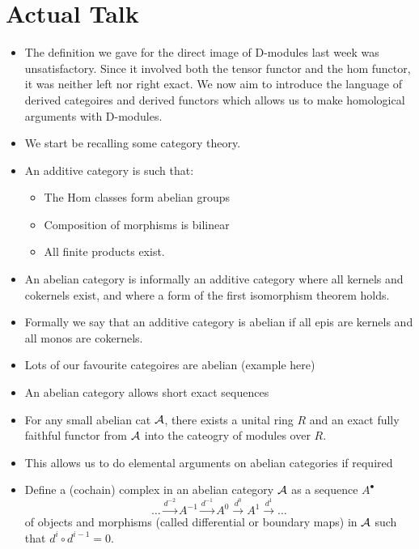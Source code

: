 \documentclass[a4paper]{article}
\begin{document}
\section{Actual Talk}
\begin{itemize}
    \item The definition we gave for the direct image of D-modules last week was unsatisfactory. Since it involved both the tensor functor and the hom functor, it was neither left nor right exact. We now aim to introduce the language of derived categoires and derived functors which allows us to make homological arguments with D-modules.
    \item We start be recalling some category theory.
    \item An additive category is such that:
        \begin{itemize}
            \item The Hom classes form abelian groups
            \item Composition of morphisms is bilinear
            \item All finite products exist.
        \end{itemize}
    \item An abelian category is informally an additive category where all kernels and cokernels exist, and where a form of the first isomorphism theorem holds.
    \item Formally we say that an additive category is abelian if all epis are kernels and all monos are cokernels.
    \item Lots of our favourite categoires are abelian (example here)
    \item An abelian category allows short exact sequences
    \item 
        \begin{Theorem}
            For any small abelian cat $\mathcal{A}$, there exists a unital ring $R$ and an exact fully faithful functor from $\mathcal{A}$ into the cateogry of modules over $R$.
        \end{Theorem}
    \item This allows us to do elemental arguments on abelian categories if required
    \item Define a (cochain) complex in an abelian category $\mathcal{A}$ as a sequence $A^\bullet$
        \[
            \dots \stackrel{d^{-2}}{\to} A^{-1} \stackrel{d^{-1}}{\to} A^{0} \stackrel{d^{0}}{\to} A^1 \stackrel{d^1}{\to} \dots
        \]
        of objects and morphisms (called differential or boundary maps) in $\mathcal{A}$ such that $d^i \circ d^{i-1} = 0$.

\end{itemize}
\end{document}
